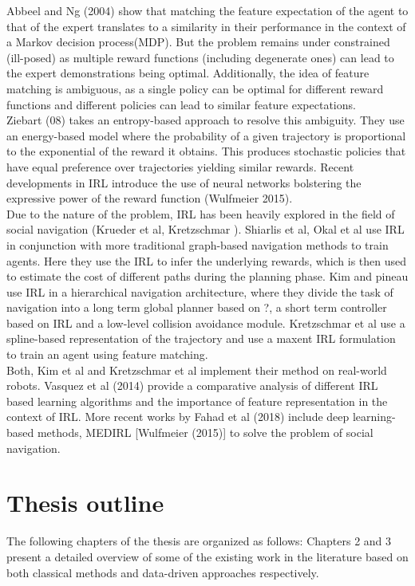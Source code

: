 Abbeel and Ng (2004) show that matching the feature expectation of the agent to that of the expert translates to a similarity in their performance in the context of a Markov decision process(MDP). But the problem remains under constrained (ill-posed) as multiple reward functions (including degenerate ones) can lead to the expert demonstrations being optimal. Additionally, the idea of feature matching is ambiguous, as a single policy can be optimal for different reward functions and different policies can lead to similar feature expectations. \\

Ziebart (08) takes an entropy-based approach to resolve this ambiguity. They use an energy-based model where the probability of a given trajectory is proportional to the exponential of the reward it obtains. This produces stochastic policies that have equal preference over trajectories yielding similar rewards. Recent developments in IRL introduce the use of neural networks bolstering the expressive power of the reward function (Wulfmeier 2015). \\

Due to the nature of the problem, IRL has been heavily explored in the field of social navigation (Krueder et al, Kretzschmar ). Shiarlis et al, Okal et al use IRL in conjunction with more traditional graph-based navigation methods to train agents. Here they use the IRL to infer the underlying rewards, which is then used to estimate the cost of different paths during the planning phase. Kim and pineau use IRL in a hierarchical navigation architecture, where they divide the task of navigation into a long term global planner based on ?, a short term controller based on IRL and a low-level collision avoidance module. Kretzschmar et al use a spline-based representation of the trajectory and use a maxent IRL formulation to train an agent using feature matching. 
\\
Both, Kim et al and Kretzschmar et al implement their method on real-world robots. Vasquez et al (2014) provide a comparative analysis of different IRL based learning algorithms and the importance of feature representation in the context of IRL. More recent works by Fahad et al (2018) include deep learning-based methods, MEDIRL [Wulfmeier (2015)] to solve the problem of social navigation.
\section{Thesis outline}


The following chapters of the thesis are organized as follows:
Chapters 2 and 3 present a detailed overview of some of the existing work in the literature based on both classical methods and data-driven approaches respectively.

